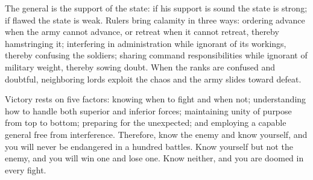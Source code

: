 \documentclass[12pt]{book}
\begin{document}
{The general is the support of the state: if his support is sound the state is strong; if flawed the state is weak. Rulers bring calamity in three ways: ordering advance when the army cannot advance, or retreat when it cannot retreat, thereby hamstringing it; interfering in administration while ignorant of its workings, thereby confusing the soldiers; sharing command responsibilities while ignorant of military weight, thereby sowing doubt. When the ranks are confused and doubtful, neighboring lords exploit the chaos and the army slides toward defeat.

Victory rests on five factors: knowing when to fight and when not; understanding how to handle both superior and inferior forces; maintaining unity of purpose from top to bottom; preparing for the unexpected; and employing a capable general free from interference. Therefore, know the enemy and know yourself, and you will never be endangered in a hundred battles. Know yourself but not the enemy, and you will win one and lose one. Know neither, and you are doomed in every fight.}
\end{document}
